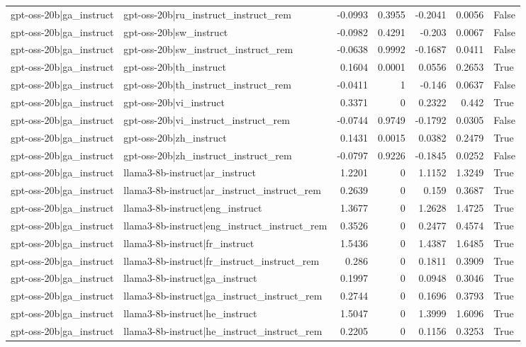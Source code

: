 \begin{table}
\begin{tabular}{l l r r r r l}
gpt-oss-20b|ga_instruct & gpt-oss-20b|ru_instruct_instruct_rem & -0.0993 & 0.3955 & -0.2041 & 0.0056 & False \\
gpt-oss-20b|ga_instruct & gpt-oss-20b|sw_instruct & -0.0982 & 0.4291 & -0.203 & 0.0067 & False \\
gpt-oss-20b|ga_instruct & gpt-oss-20b|sw_instruct_instruct_rem & -0.0638 & 0.9992 & -0.1687 & 0.0411 & False \\
gpt-oss-20b|ga_instruct & gpt-oss-20b|th_instruct & 0.1604 & 0.0001 & 0.0556 & 0.2653 & True \\
gpt-oss-20b|ga_instruct & gpt-oss-20b|th_instruct_instruct_rem & -0.0411 & 1 & -0.146 & 0.0637 & False \\
gpt-oss-20b|ga_instruct & gpt-oss-20b|vi_instruct & 0.3371 & 0 & 0.2322 & 0.442 & True \\
gpt-oss-20b|ga_instruct & gpt-oss-20b|vi_instruct_instruct_rem & -0.0744 & 0.9749 & -0.1792 & 0.0305 & False \\
gpt-oss-20b|ga_instruct & gpt-oss-20b|zh_instruct & 0.1431 & 0.0015 & 0.0382 & 0.2479 & True \\
gpt-oss-20b|ga_instruct & gpt-oss-20b|zh_instruct_instruct_rem & -0.0797 & 0.9226 & -0.1845 & 0.0252 & False \\
gpt-oss-20b|ga_instruct & llama3-8b-instruct|ar_instruct & 1.2201 & 0 & 1.1152 & 1.3249 & True \\
gpt-oss-20b|ga_instruct & llama3-8b-instruct|ar_instruct_instruct_rem & 0.2639 & 0 & 0.159 & 0.3687 & True \\
gpt-oss-20b|ga_instruct & llama3-8b-instruct|eng_instruct & 1.3677 & 0 & 1.2628 & 1.4725 & True \\
gpt-oss-20b|ga_instruct & llama3-8b-instruct|eng_instruct_instruct_rem & 0.3526 & 0 & 0.2477 & 0.4574 & True \\
gpt-oss-20b|ga_instruct & llama3-8b-instruct|fr_instruct & 1.5436 & 0 & 1.4387 & 1.6485 & True \\
gpt-oss-20b|ga_instruct & llama3-8b-instruct|fr_instruct_instruct_rem & 0.286 & 0 & 0.1811 & 0.3909 & True \\
gpt-oss-20b|ga_instruct & llama3-8b-instruct|ga_instruct & 0.1997 & 0 & 0.0948 & 0.3046 & True \\
gpt-oss-20b|ga_instruct & llama3-8b-instruct|ga_instruct_instruct_rem & 0.2744 & 0 & 0.1696 & 0.3793 & True \\
gpt-oss-20b|ga_instruct & llama3-8b-instruct|he_instruct & 1.5047 & 0 & 1.3999 & 1.6096 & True \\
gpt-oss-20b|ga_instruct & llama3-8b-instruct|he_instruct_instruct_rem & 0.2205 & 0 & 0.1156 & 0.3253 & True \\

\end{tabular}
\end{table}
